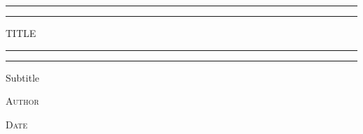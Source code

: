 \begin{titlepage}

  \centering

  \scshape %

  \vspace*{\baselineskip}

  \rule{\textwidth}{1.6pt}\vspace*{-\baselineskip}\vspace*{2pt}
  \rule{\textwidth}{0.4pt}

  \vspace{0.75\baselineskip}

  {\LARGE TITLE}

  \vspace{0.75\baselineskip}

  \rule{\textwidth}{0.4pt}\vspace*{-\baselineskip}\vspace{3.2pt}
  \rule{\textwidth}{1.6pt}

  \vspace{2\baselineskip}

  Subtitle

  \vspace*{3\baselineskip}

  \vspace{0.5\baselineskip}

  {\scshape\large Author}

  \vspace{0.5\baselineskip}

  {\scshape Date}

\end{titlepage}
